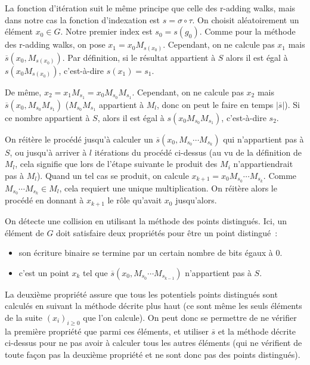       La fonction d'itération suit le même principe que celle des r-adding walks, mais dans notre cas la fonction d'indexation est $s = \sigma \circ \tau$. On choisit aléatoirement un élément $x_0 \in G$. Notre premier index est $s_0 = s(g_0)$. Comme pour la méthode des r-adding walks, on pose $x_1 = x_0 M_{s(x_0)}$. Cependant, on ne calcule pas $x_1$ mais $\overline{s}(x_0,M_{s(x_0)})$. Par définition, si le résultat appartient à $S$ alors il est égal à $s(x_0 M_{s(x_0)})$, c'est-à-dire $s(x_1) = s_1$.

      De même, $x_2 = x_1 M_{s_1} = x_0 M_{s_0} M_{s_1}$. Cependant, on ne calcule pas $x_2$ mais $\overline{s}(x_0,M_{s_0} M_{s_1})$ ($M_{s_0} M_{s_1}$ appartient à $M_l$, donc on peut le faire en temps $|\overline{s}|$). Si ce nombre appartient à $S$, alors il est égal à $s(x_0 M_{s_0} M_{s_1})$, c'est-à-dire $s_2$.

      On réitère le procédé jusqu'à calculer un $\overline{s}(x_0,M_{s_0} \cdots M_{s_k})$ qui n'appartient pas à $S$, ou jusqu'à arriver à $l$ itérations du procédé ci-dessus (au vu de la définition de $M_l$, cela signifie que lors de l'étape suivante le produit des $M_i$ n'appartiendrait pas à $M_l$). Quand un tel cas se produit, on calcule $x_{k+1} = x_0 M_{s_0} \cdots M_{s_k}$. Comme $M_{s_0} \cdots M_{s_k} \in M_l$, cela requiert une unique multiplication. On réitère alors le procédé en donnant à $x_{k+1}$ le rôle qu'avait $x_0$ jusqu'alors.

      On détecte une collision en utilisant la méthode des points distingués. Ici, un élément de $G$ doit satisfaire deux propriétés pour être un point distingué~:

      \begin{itemize}
        \item son écriture binaire se termine par un certain nombre de bits égaux à $0$.
        \item c'est un point $x_k$ tel que $\overline{s}(x_0,M_{s_0} \cdots M_{s_{k-1}})$ n'appartient pas à $S$.
      \end{itemize}

      La deuxième propriété assure que tous les potentiels points distingués sont calculés en suivant la méthode décrite plus haut (ce sont même les seuls éléments de la suite $(x_i)_{i \ge 0}$ que l'on calcule). On peut donc se permettre de ne vérifier la première propriété que parmi ces éléments, et utiliser $\overline{s}$ et la méthode décrite ci-dessus pour ne pas avoir à calculer tous les autres éléments (qui ne vérifient de toute façon pas la deuxième propriété et ne sont donc pas des points distingués).


